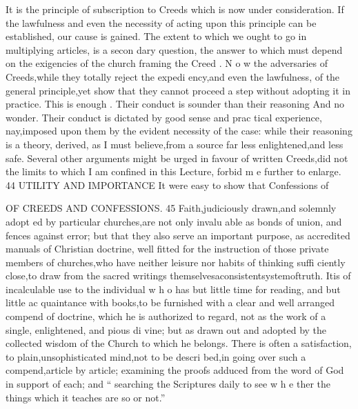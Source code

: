\documentclass[
]{book}
\begin{document}
It is the principle of subscription to Creeds which is now under consideration. If the
lawfulness and even the necessity of acting upon this principle can be established, our cause is gained. The extent to which we ought to go in multiplying articles, is a secon dary question, the answer to which must depend on the exigencies of the church framing the Creed . N o w the adversaries of
Creeds,while they totally reject the expedi ency,and even the lawfulness, of the general
principle,yet show that they cannot proceed a step without adopting it in practice. This
is enough . Their conduct is sounder than their reasoning And no wonder. Their
conduct is dictated by good sense and prac
tical experience, nay,imposed upon them by
the evident necessity of the case: while their
reasoning is a theory, derived, as I must
believe,from a source far less enlightened,and less safe.
Several other arguments might be urged in favour of written Creeds,did not the limits to
which I am confined in this Lecture, forbid m e further to enlarge.
44
UTILITY AND IMPORTANCE
It were easy to show that Confessions of

OF CREEDS AND CONFESSIONS. 45
Faith,judiciously drawn,and solemnly adopt ed by particular churches,are not only invalu able as bonds of union, and fences against error; but that they also serve an important purpose, as accredited manuals of Christian doctrine, well fitted for the instruction of those private members of churches,who have neither leisure nor habits of thinking suffi ciently close,to draw from the sacred writings themselvesaconsistentsystemoftruth. Itis of incalculable use to the individual w h o has
but little time for reading, and but little ac quaintance with books,to be furnished with a
clear and well arranged compend of doctrine, which he is authorized to regard, not as the
work of a single, enlightened, and pious di vine; but as drawn out and adopted by the collected wisdom of the Church to which he
belongs. There is often a satisfaction, to plain,unsophisticated mind,not to be descri
bed,in going over such a compend,article by article; examining the proofs adduced from the word of God in support of each; and `` searching the Scriptures daily to see w h e
ther the things which it teaches are so or not.''
\end{document}
